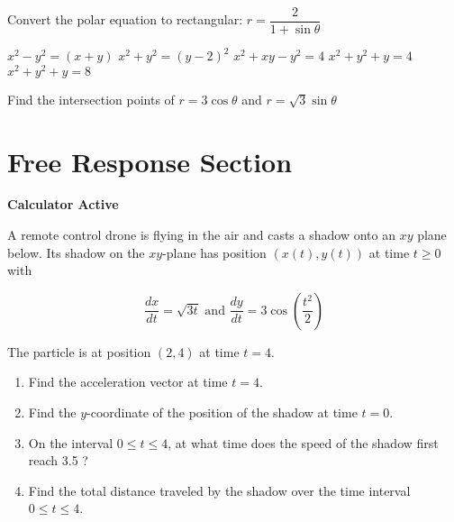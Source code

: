 \documentclass[11pt]{exam}
\begin{document}
\begin{questions}
\begin{minipage}{\linewidth}
\question Convert the polar equation to rectangular: $r = \dfrac{2}{1 + \sin \theta}$

\begin{choices}
	\choice $x^2 - y^2 = (x+y)$
	\correctchoice $x^2 + y^2 = (y-2)^2$
	\choice $x^2 + xy - y^2 = 4$
	\choice $x^2+y^2 + y = 4$
	\choice $x^2+y^2 + y = 8$
\end{choices} \answerline
\end{minipage}

\begin{minipage}{\linewidth}


\question Find the intersection points of $r = 3 \cos \theta$ and $r = \sqrt3 \sin \theta$

\begin{choices}

\end{choices} \answerline
\end{minipage}

\end{questions}

\clearpage
\section*{Free Response Section}
\noindent
\textbf{Calculator Active}
\vspace{2ex}

A remote control drone is flying in the air and casts a shadow onto
an $xy$ plane below. Its shadow on the $x y$-plane has position $(x(t), y(t))$ at time $t \geq 0$ with

$$
\frac{d x}{d t}=\sqrt{3 t} \text { and } \frac{d y}{d t}=3 \cos \left(\frac{t^{2}}{2}\right)
$$

The particle is at position $(2,4)$ at time $t=4$.
\begin{enumerate}
\item Find the acceleration vector at time $t=4$.
\vspace{1in}
\item Find the $y$-coordinate of the position of the shadow at time $t=0$.
\vspace{1in}
\item On the interval $0 \leq t \leq 4$, at what time does the speed of the shadow first reach 3.5 ?
\vspace{2in}
\item Find the total distance traveled by the shadow over the time interval $0 \leq t \leq 4$.
\end{enumerate}
\end{document}
